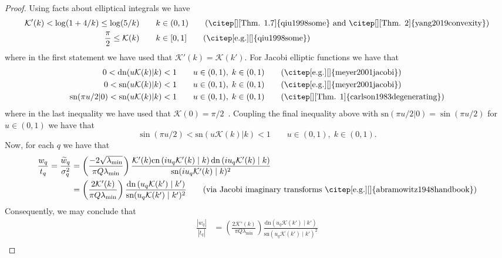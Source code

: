 \begin{proof}
  Using facts about elliptical integrals we have
  \begin{align}
    \mathcal{K}'(k) < \log(1 + 4 / k) \leq \log( 5 / k) &\qquad k \in (0, 1)
    \tag{\citep[][Thm. 1.7]{qiu1998some} and \citep[][Thm. 2]{yang2019convexity}}
    \\
    \frac{\pi}{2} \leq \mathcal{K}(k) &\qquad k\in[0,1] \tag{\citep[e.g.][]{qiu1998some}}
  \end{align}
  where in the first statement we have used that $\mathcal{K}'(k) = \mathcal{K}(k').$ For Jacobi elliptic functions we have that
  \begin{align}
    0 < \text{dn}(u \mathcal{K}(k)| k ) < 1 &\qquad u\in (0,1), \; k \in (0, 1) \tag{\citep[e.g.][]{meyer2001jacobi}}
    \\
    0 < \text{sn}( u \mathcal{K}(k)| k ) < 1 &\qquad u\in(0,1), \; k \in (0, 1) \tag{\citep[e.g.][]{meyer2001jacobi}}
    \\
    \text{sn}( \pi u /2 | 0 ) < \text{sn}( u \mathcal{K}(k)| k ) < 1 &\qquad u\in(0,1), \; k \in (0, 1) \tag{\citep[][Thm. 1]{carlson1983degenerating}}
  \end{align}
  where in the last inequality we have used that $\mathcal{K}(0) = \pi / 2$~\citep[e.g.][]{abramowitz1948handbook}. Coupling the final inequality above with $\text{sn}( \pi u /2 | 0 ) = \sin(\pi u / 2)$ for $u\in(0,1)$ we have that
  \[
  \sin( \pi u /2 ) < \text{sn}( u \mathcal{K}(k)| k ) < 1 \qquad u\in(0,1), \; k \in (0, 1).
  \]
  Now, for each $q$ we have that
  \begin{align*}
  \frac{w_q}{t_q}
    =
    \frac{\widetilde w_q}{\sigma^2_q}
    &= \left(\frac{- 2\sqrt{\lambda_{\min}}}{\pi Q \lambda_{\min}}\right)\frac{\mathcal{K}'( k )\text{cn} \left( i u_q \mathcal{K}'(k) \mid k \right)\text{dn} \left( i u_q \mathcal{K}'(k) \mid k \right)}{\text{sn}(i u_q \mathcal{K}'(k) \mid k)^2}
    \\
    &=\left(\frac{2\mathcal{K}'( k )}{\pi Q \lambda_{\min}}\right)\frac{\text{dn} \left( u_q \mathcal{K}(k') \mid k' \right)}{\text{sn}(u_q \mathcal{K}(k') \mid k')^2}
    \tag{via Jacobi imaginary transforms~\citep[e.g.][]{abramowitz1948handbook}}
  \end{align*}
  Consequently, we may conclude that
  \begin{align*}
    \frac{|w_q|}{|t_q|}
    &= \left(\frac{2\mathcal{K}'( k )}{\pi Q \lambda_{\min}}\right)\frac{\text{dn} \left( u_q \mathcal{K}(k') \mid k' \right)}{\text{sn}(u_q \mathcal{K}(k') \mid k')^2} \\

\end{align*}
\end{proof}
